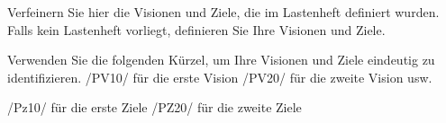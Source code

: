 	
%                                                                              
%                                                                              
Verfeinern Sie hier die Visionen und Ziele, die im Lastenheft definiert wurden. Falls kein Lastenheft vorliegt, definieren Sie Ihre Visionen und Ziele.

Verwenden Sie die folgenden Kürzel, um Ihre Visionen und Ziele eindeutig zu identifizieren.
/PV10/ für die erste Vision
/PV20/ für die zweite Vision
usw.

/Pz10/ für die erste Ziele
/PZ20/ für die zweite Ziele